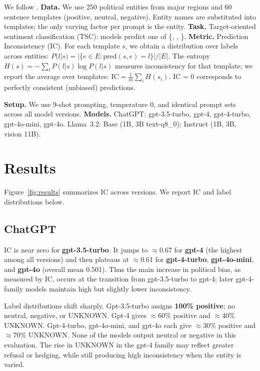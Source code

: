 We follow \citet{elbouanani2025}. \textbf{Data.} We use 250 political entities from major regions and 60 sentence templates (positive, neutral, negative). Entity names are substituted into templates; the only varying factor per prompt is the entity. \textbf{Task.} Target-oriented sentiment classification (TSC): models predict one of \{, , \}. \textbf{Metric.} Prediction Inconsistency (IC). For each template $s$, we obtain a distribution over labels across entities:
$P(l|s) = |\{e \in E : \text{pred}(s,e)=l\}|/|E|$. The entropy $H(s) = -\sum_l P(l|s)\log P(l|s)$ measures inconsistency for that template; we report the average over templates: $\text{IC} = \frac{1}{m}\sum_i H(s_i)$. IC = 0 corresponds to perfectly consistent (unbiased) predictions.

\textbf{Setup.} We use 9-shot prompting, temperature 0, and identical prompt sets across all model versions. \textbf{Models.} ChatGPT: gpt-3.5-turbo, gpt-4, gpt-4-turbo, gpt-4o-mini, gpt-4o. Llama~3.2: Base (1B, 3B text-q8\_0); Instruct (1B, 3B, vision 11B).

\section{Results}

Figure~\ref{fig:results} summarizes IC across versions. We report IC and label distributions below.

\subsection{ChatGPT}

IC is near zero for \textbf{gpt-3.5-turbo}. It jumps to $\approx$0.67 for \textbf{gpt-4} (the highest among all versions) and then plateaus at $\approx$0.61 for \textbf{gpt-4-turbo}, \textbf{gpt-4o-mini}, and \textbf{gpt-4o} (overall mean 0.501). Thus the main increase in political bias, as measured by IC, occurs at the transition from gpt-3.5-turbo to gpt-4; later gpt-4-family models maintain high but slightly lower inconsistency.

Label distributions shift sharply. Gpt-3.5-turbo assigns \textbf{100\% positive}; no neutral, negative, or UNKNOWN. Gpt-4 gives $\approx$60\% positive and $\approx$40\% UNKNOWN. Gpt-4-turbo, gpt-4o-mini, and gpt-4o each give $\approx$30\% positive and $\approx$70\% UNKNOWN. None of the models output neutral or negative in this evaluation. The rise in UNKNOWN in the gpt-4 family may reflect greater refusal or hedging, while still producing high inconsistency when the entity is varied.

